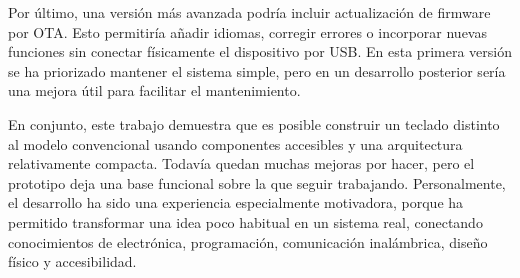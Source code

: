Por último, una versión más avanzada podría incluir actualización de firmware por OTA. Esto permitiría añadir idiomas, corregir errores o incorporar nuevas funciones sin conectar físicamente el dispositivo por USB. En esta primera versión se ha priorizado mantener el sistema simple, pero en un desarrollo posterior sería una mejora útil para facilitar el mantenimiento.

En conjunto, este trabajo demuestra que es posible construir un teclado distinto al modelo convencional usando componentes accesibles y una arquitectura relativamente compacta. Todavía quedan muchas mejoras por hacer, pero el prototipo deja una base funcional sobre la que seguir trabajando. Personalmente, el desarrollo ha sido una experiencia especialmente motivadora, porque ha permitido transformar una idea poco habitual en un sistema real, conectando conocimientos de electrónica, programación, comunicación inalámbrica, diseño físico y accesibilidad.
